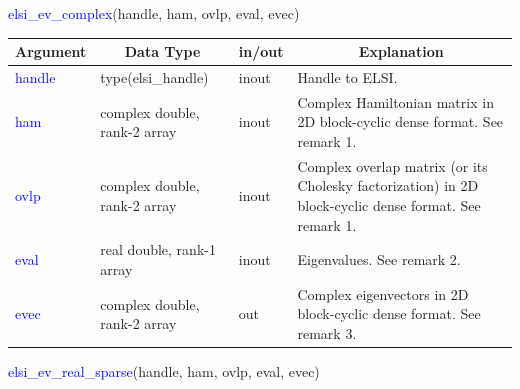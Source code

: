 \documentclass{report}
\begin{document}
\newpage
\begin{labeling}{\hspace{6cm}}
\item [\hspace{0.3cm} \textcolor{blue}{elsi\_ev\_complex}(handle, ham, ovlp, eval, evec)]
\end{labeling}

\begin{tabular}[]{|p{20mm}|p{45mm}|p{15mm}|p{85mm}|}
\hline
\multicolumn{1}{|c|}{\textbf{Argument}} & \multicolumn{1}{c|}{\textbf{Data Type}} & \multicolumn{1}{c|}{\textbf{in/out}} & \multicolumn{1}{c|}{\textbf{Explanation}}\\
\hline
\textcolor{blue}{handle} & type(elsi\_handle)           & inout & Handle to ELSI.\\
\hline
\textcolor{blue}{ham}    & complex double, rank-2 array & inout & Complex Hamiltonian matrix in 2D block-cyclic dense format. See remark 1.\\
\hline
\textcolor{blue}{ovlp}   & complex double, rank-2 array & inout & Complex overlap matrix (or its Cholesky factorization) in 2D block-cyclic dense format. See remark 1.\\
\hline
\textcolor{blue}{eval}   & real double, rank-1 array    & inout & Eigenvalues. See remark 2.\\
\hline
\textcolor{blue}{evec}   & complex double, rank-2 array & out   & Complex eigenvectors in 2D block-cyclic dense format. See remark 3.\\
\hline
\end{tabular}

\begin{labeling}{\hspace{6cm}}
\item [\hspace{0.3cm} \textcolor{blue}{elsi\_ev\_real\_sparse}(handle, ham, ovlp, eval, evec)]
\end{labeling}
\end{document}
